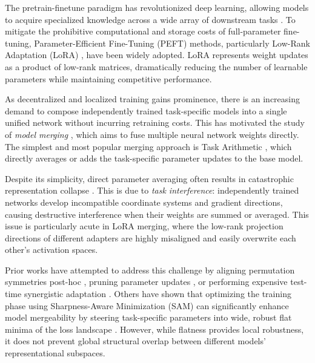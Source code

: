 \documentclass{article}
\theoremstyle{plain}
\theoremstyle{definition}
\theoremstyle{remark}
\begin{document}
The pretrain-finetune paradigm has revolutionized deep learning, allowing models to acquire specialized knowledge across a wide array of downstream tasks \cite{devlin2018bert, vaswani2017attention}. To mitigate the prohibitive computational and storage costs of full-parameter fine-tuning, Parameter-Efficient Fine-Tuning (PEFT) methods, particularly Low-Rank Adaptation (LoRA) \cite{hu2021lora}, have been widely adopted. LoRA represents weight updates as a product of low-rank matrices, dramatically reducing the number of learnable parameters while maintaining competitive performance.

As decentralized and localized training gains prominence, there is an increasing demand to compose independently trained task-specific models into a single unified network without incurring retraining costs. This has motivated the study of \textit{model merging} \cite{wortsman2022model, li2023deep}, which aims to fuse multiple neural network weights directly. The simplest and most popular merging approach is Task Arithmetic \cite{ilharco2022editing}, which directly averages or adds the task-specific parameter updates to the base model.

Despite its simplicity, direct parameter averaging often results in catastrophic representation collapse \cite{yadav2023ties}. This is due to \textit{task interference}: independently trained networks develop incompatible coordinate systems and gradient directions, causing destructive interference when their weights are summed or averaged. This issue is particularly acute in LoRA merging, where the low-rank projection directions of different adapters are highly misaligned and easily overwrite each other's activation spaces.

Prior works have attempted to address this challenge by aligning permutation symmetries post-hoc \cite{ainsworth2022git, mi2022permutation}, pruning parameter updates \cite{yadav2023ties, yu2024dare}, or performing expensive test-time synergistic adaptation \cite{symerge2025steering}. Others have shown that optimizing the training phase using Sharpness-Aware Minimization (SAM) \cite{foret2021sam} can significantly enhance model mergeability by steering task-specific parameters into wide, robust flat minima of the loss landscape \cite{satalr2026flatter, saortho2026saortho}. However, while flatness provides local robustness, it does not prevent global structural overlap between different models' representational subspaces.
\end{document}
